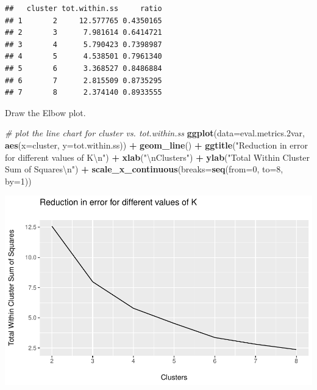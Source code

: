 \documentclass[]{article}
\newenvironment{Shaded}{\begin{snugshade}}{\end{snugshade}}
\newcommand{\KeywordTok}[1]{\textcolor[rgb]{0.13,0.29,0.53}{\textbf{#1}}}
\newcommand{\DataTypeTok}[1]{\textcolor[rgb]{0.13,0.29,0.53}{#1}}
\newcommand{\DecValTok}[1]{\textcolor[rgb]{0.00,0.00,0.81}{#1}}
\newcommand{\CharTok}[1]{\textcolor[rgb]{0.31,0.60,0.02}{#1}}
\newcommand{\StringTok}[1]{\textcolor[rgb]{0.31,0.60,0.02}{#1}}
\newcommand{\CommentTok}[1]{\textcolor[rgb]{0.56,0.35,0.01}{\textit{#1}}}
\newcommand{\OperatorTok}[1]{\textcolor[rgb]{0.81,0.36,0.00}{\textbf{#1}}}
\newcommand{\NormalTok}[1]{#1}
\begin{document}
\begin{verbatim}
##   cluster tot.within.ss     ratio
## 1       2     12.577765 0.4350165
## 2       3      7.981614 0.6414721
## 3       4      5.790423 0.7398987
## 4       5      4.538501 0.7961340
## 5       6      3.368527 0.8486884
## 6       7      2.815509 0.8735295
## 7       8      2.374140 0.8933555
\end{verbatim}

Draw the Elbow plot.

\begin{Shaded}
\begin{Highlighting}[]
\CommentTok{# plot the line chart for cluster vs. tot.within.ss }
\KeywordTok{ggplot}\NormalTok{(}\DataTypeTok{data=}\NormalTok{eval.metrics.2var, }\KeywordTok{aes}\NormalTok{(}\DataTypeTok{x=}\NormalTok{cluster, }\DataTypeTok{y=}\NormalTok{tot.within.ss)) }\OperatorTok{+}\StringTok{ }
\StringTok{  }\KeywordTok{geom_line}\NormalTok{() }\OperatorTok{+}
\StringTok{  }\KeywordTok{ggtitle}\NormalTok{(}\StringTok{"Reduction in error for different values of K}\CharTok{\textbackslash{}n}\StringTok{"}\NormalTok{) }\OperatorTok{+}
\StringTok{  }\KeywordTok{xlab}\NormalTok{(}\StringTok{"}\CharTok{\textbackslash{}n}\StringTok{Clusters"}\NormalTok{) }\OperatorTok{+}\StringTok{ }
\StringTok{  }\KeywordTok{ylab}\NormalTok{(}\StringTok{"Total Within Cluster Sum of Squares}\CharTok{\textbackslash{}n}\StringTok{"}\NormalTok{) }\OperatorTok{+}
\StringTok{  }\KeywordTok{scale_x_continuous}\NormalTok{(}\DataTypeTok{breaks=}\KeywordTok{seq}\NormalTok{(}\DataTypeTok{from=}\DecValTok{0}\NormalTok{, }\DataTypeTok{to=}\DecValTok{8}\NormalTok{, }\DataTypeTok{by=}\DecValTok{1}\NormalTok{))}
\end{Highlighting}
\end{Shaded}

\begin{center}\includegraphics{7._K-means_Clustering_files/figure-latex/unnamed-chunk-29-1} \end{center}
\end{document}
